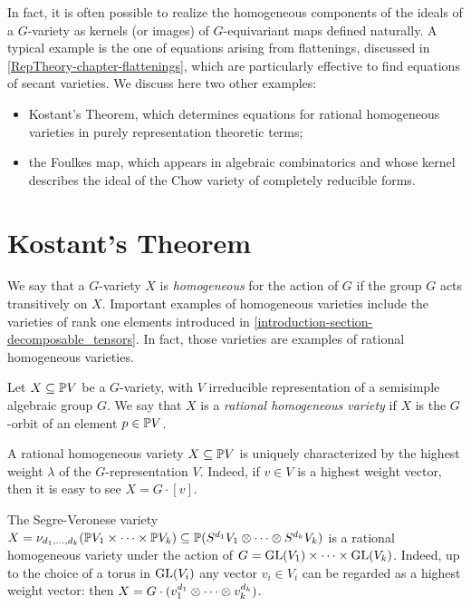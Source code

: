 In fact, it is often possible to realize the homogeneous components of the ideals of a $G$-variety as kernels (or images) of $G$-equivariant maps defined naturally.  A typical example is the one of equations arising from flattenings, discussed in \ref{RepTheory-chapter-flattenings}, which are particularly effective to find equations of secant varieties. We discuss here two other examples:
\begin{itemize}
 \item Kostant's Theorem, which determines equations for rational homogeneous varieties in purely representation theoretic terms;
 \item the Foulkes map, which appears in algebraic combinatorics and whose kernel describes the ideal of the Chow variety of completely reducible forms.
\end{itemize}

\section{Kostant's Theorem}
\label{RepTheory-section-kostant}
We say that a $G$-variety $X$ is \emph{homogeneous} for the action of $G$ if the group $G$ acts transitively on $X$. Important examples of homogeneous varieties include the varieties of rank one elements introduced in \ref{introduction-section-decomposable_tensors}. In fact, those varieties are examples of rational homogeneous varieties.
\begin{definition}
 \label{reptheory-definition-rationalhomogeneousvariety}
 Let $X \subseteq \mathbb{P} V$ be a $G$-variety, with $V$ irreducible representation of a semisimple algebraic group $G$. We say that $X$ is a {\it rational homogeneous variety} if $X$ is the $G$-orbit of an element $p \in \mathbb{P} V$.
\end{definition}
A rational homogeneous variety $X \subseteq \mathbb{P} V$ is uniquely characterized by the highest weight $\lambda$ of the $G$-representation $V$. Indeed, if $v \in V$ is a highest weight vector, then it is easy to see $X = G \cdot [v]$. 

\begin{example}
 \label{reptheory-example-RHV}
 The Segre-Veronese variety $X = \nu_{d_1 , \ldots , d_k} (\mathbb{P} V_1 \times \cdots \times \mathbb{P} V_k) \subseteq \mathbb{P} (S^{d_1} V_1 \otimes \cdots \otimes S^{d_k}V_k)$ is a rational homogeneous variety under the action of $G = \mathrm{GL}(V_1) \times \cdots \times \mathrm{GL}(V_k)$. Indeed, up to the choice of a torus in $\mathrm{GL}(V_i)$ any vector $v_i \in V_i$ can be regarded as a highest weight vector: then $X = G \cdot (v_1^{d_1} \otimes \cdots \otimes v_k^{d_k})$. 
\end{example}

